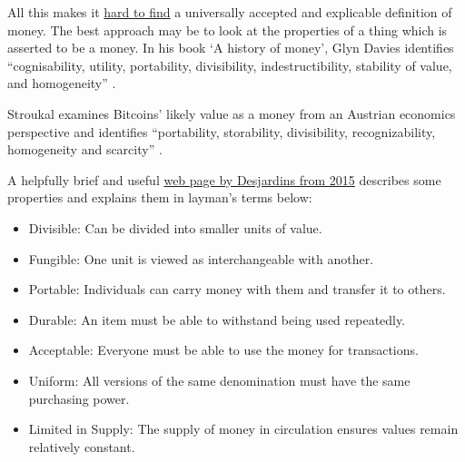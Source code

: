All this makes it \href{https://www.lynalden.com/what-is-money/}{hard to find} a universally accepted and explicable definition of money. The best approach may be to look at the properties of a thing which is asserted to be a money. In his book `A history of money', Glyn Davies identifies ``cognisability, utility,  portability, divisibility, indestructibility, stability of value, and homogeneity'' \cite{davies2010history}.\par
Stroukal examines Bitcoins' likely value as a money from an Austrian economics perspective and identifies ``portability, storability, divisibility, recognizability, homogeneity and scarcity'' \cite{stroukal2018can}.\par
A helpfully brief and useful \href{http://money.visualcapitalist.com/infographic-the-properties-of-money/}{web page by Desjardins from 2015} describes some properties and explains them in layman's terms below:
\begin{itemize}
\item Divisible: Can be divided into smaller units of value.
\item Fungible: One unit is viewed as interchangeable with another.
\item Portable: Individuals can carry money with them and transfer it to others.
\item Durable: An item must be able to withstand being used repeatedly.
\item Acceptable: Everyone must be able to use the money for transactions.
\item Uniform: All versions of the same denomination must have the same purchasing power.
\item Limited in Supply: The supply of money in circulation ensures values remain relatively constant.
\end{itemize}

